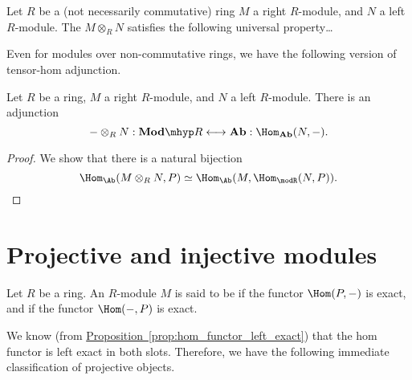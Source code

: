\documentclass[main.tex]{subfiles}
\begin{document}
\begin{definition}
  \label{def:tensor_product}
  Let $R$ be a (not necessarily commutative) ring $M$ a right $R$-module, and $N$ a left $R$-module. The  $M \otimes_{R} N$ satisfies the following universal property\dots
\end{definition}

Even for modules over non-commutative rings, we have the following version of tensor-hom adjunction.
\begin{proposition}
  Let $R$ be a ring, $M$ a right $R$-module, and $N$ a left $R$-module. There is an adjunction
  \begin{equation*}
    - \otimes_{R} N : \mathbf{Mod}\mhyp R \longleftrightarrow \mathbf{Ab} : \Hom_{\mathbf{Ab}}(N, -).
  \end{equation*}
\end{proposition}
\begin{proof}
  We show that there is a natural bijection
  \begin{equation*}
    \Hom_{\Ab}(M \otimes_{R} N, P) \simeq \Hom_{\Ab}(M, \Hom_{\modR}(N, P)).
  \end{equation*}
\end{proof}

\section{Projective and injective modules}
\label{sec:projective_and_injective_modules}

\begin{definition}
  \label{def:projective_injective_module}
  Let $R$ be a ring. An $R$-module $M$ is said to be  if the functor $\Hom(P, -)$ is exact, and  if the functor $\Hom(-, P)$ is exact.
\end{definition}

We know (from \hyperref[prop:hom_functor_left_exact]{Proposition~\ref*{prop:hom_functor_left_exact}}) that the hom functor is left exact in both slots. Therefore, we have the following immediate classification of projective objects.
\end{document}
